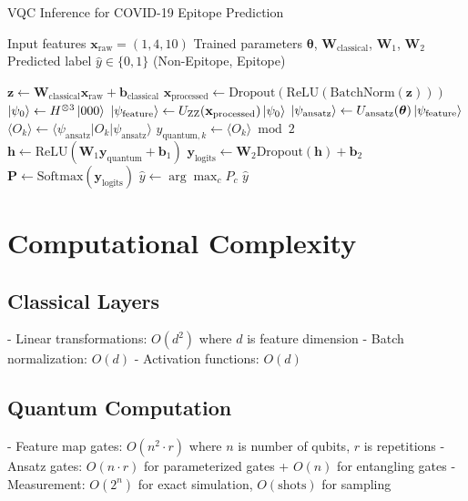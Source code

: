 \documentclass[12pt]{article}
\begin{document}
\begin{algorithm}
\caption{VQC Inference for COVID-19 Epitope Prediction}
\begin{algorithmic}[1]
\REQUIRE Input features $\mathbf{x}_{\text{raw}} = (1, 4, 10)$
\REQUIRE Trained parameters $\boldsymbol{\theta}$, $\mathbf{W}_{\text{classical}}$, $\mathbf{W}_1$, $\mathbf{W}_2$
\ENSURE Predicted label $\hat{y} \in \{0, 1\}$ (Non-Epitope, Epitope)

\STATE $\mathbf{z} \leftarrow \mathbf{W}_{\text{classical}} \mathbf{x}_{\text{raw}} + \mathbf{b}_{\text{classical}}$
\STATE $\mathbf{x}_{\text{processed}} \leftarrow \text{Dropout}(\text{ReLU}(\text{BatchNorm}(\mathbf{z})))$
\STATE $\ket{\psi_0} \leftarrow H^{\otimes 3} \ket{000}$
\STATE $\ket{\psi_{\text{feature}}} \leftarrow U_{\text{ZZ}}(\mathbf{x}_{\text{processed}}) \ket{\psi_0}$
\STATE $\ket{\psi_{\text{ansatz}}} \leftarrow U_{\text{ansatz}}(\boldsymbol{\theta}) \ket{\psi_{\text{feature}}}$
    \STATE $\langle O_k \rangle \leftarrow \langle \psi_{\text{ansatz}} | O_k | \psi_{\text{ansatz}} \rangle$
    \STATE $y_{\text{quantum},k} \leftarrow \langle O_k \rangle \bmod 2$
\ENDFOR
\STATE $\mathbf{h} \leftarrow \text{ReLU}(\mathbf{W}_1 \mathbf{y}_{\text{quantum}} + \mathbf{b}_1)$
\STATE $\mathbf{y}_{\text{logits}} \leftarrow \mathbf{W}_2 \text{Dropout}(\mathbf{h}) + \mathbf{b}_2$
\STATE $\mathbf{P} \leftarrow \text{Softmax}(\mathbf{y}_{\text{logits}})$
\STATE $\hat{y} \leftarrow \arg\max_c P_c$
\RETURN $\hat{y}$
\end{algorithmic}
\end{algorithm}

\section{Computational Complexity}

\subsection{Classical Layers}
- Linear transformations: $O(d^2)$ where $d$ is feature dimension
- Batch normalization: $O(d)$
- Activation functions: $O(d)$

\subsection{Quantum Computation}
- Feature map gates: $O(n^2 \cdot r)$ where $n$ is number of qubits, $r$ is repetitions
- Ansatz gates: $O(n \cdot r)$ for parameterized gates + $O(n)$ for entangling gates
- Measurement: $O(2^n)$ for exact simulation, $O(\text{shots})$ for sampling
\end{document}
